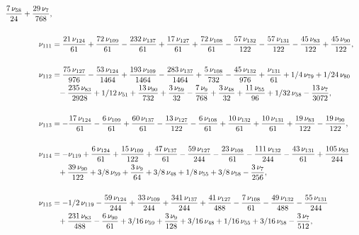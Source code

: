\documentclass[a4paper,12pt, DIV=14, BCOR=5mm, twoside, headsepline]{scrbook}
\begin{document}
\begin{align}
\begin{aligned}
{\frac {7\,\nu_{{58}}}{24}}+{\frac {29\,\nu_{{7}}}{768}}, \\
\\
\nu_{{111}}&={
\frac {21\,\nu_{{124}}}{61}}+{\frac {72\,\nu_{{109}}}{61}}-{\frac {232
\,\nu_{{137}}}{61}}+{\frac {17\,\nu_{{127}}}{61}}+{\frac {72\,\nu_{{
108}}}{61}}-{\frac {57\,\nu_{{132}}}{122}}-{\frac {57\,\nu_{{131}}}{
122}}-{\frac {45\,\nu_{{83}}}{122}}+{\frac {45\,\nu_{{90}}}{122}}, \\
\\
\nu_
{{112}}&={\frac {75\,\nu_{{127}}}{976}}-{\frac {53\,\nu_{{124}}}{1464}}
+{\frac {193\,\nu_{{109}}}{1464}}-{\frac {283\,\nu_{{137}}}{1464}}+{
\frac {5\,\nu_{{108}}}{732}}-{\frac {45\,\nu_{{132}}}{976}}+{\frac {
\nu_{{131}}}{61}}+1/4\,\nu_{{79}}+1/24\,\nu_{{80}}\\
 &\hphantom{=}-{\frac {235\,\nu_{{
83}}}{2928}}+1/12\,\nu_{{51}}+{\frac {13\,\nu_{{90}}}{732}}+{\frac {3
\,\nu_{{59}}}{32}}-{\frac {7\,\nu_{{9}}}{768}}+{\frac {3\,\nu_{{48}}}{
32}}+{\frac {11\,\nu_{{55}}}{96}}+1/32\,\nu_{{58}}-{\frac {13\,\nu_{{7
}}}{3072}}, \\
\\
\nu_{{113}}&=-{\frac {17\,\nu_{{124}}}{61}}-{\frac {6\,\nu_{
{109}}}{61}}+{\frac {60\,\nu_{{137}}}{61}}-{\frac {13\,\nu_{{127}}}{
122}}-{\frac {6\,\nu_{{108}}}{61}}+{\frac {10\,\nu_{{132}}}{61}}+{
\frac {10\,\nu_{{131}}}{61}}+{\frac {19\,\nu_{{83}}}{122}}-{\frac {19
\,\nu_{{90}}}{122}},\\
\\
\nu_{{114}}&=-\nu_{{119}}+{\frac {6\,\nu_{{124}}}{
61}}+{\frac {15\,\nu_{{109}}}{122}}+{\frac {47\,\nu_{{137}}}{61}}-{
\frac {59\,\nu_{{127}}}{244}}-{\frac {23\,\nu_{{108}}}{61}}-{\frac {
111\,\nu_{{132}}}{244}}-{\frac {43\,\nu_{{131}}}{61}}+{\frac {105\,\nu
_{{83}}}{244}}\\
 &\hphantom{=}+{\frac {39\,\nu_{{90}}}{122}}+3/8\,\nu_{{59}}+{\frac {3
\,\nu_{{9}}}{64}}+3/8\,\nu_{{48}}+1/8\,\nu_{{55}}+3/8\,\nu_{{58}}-{
\frac {3\,\nu_{{7}}}{256}}, \\
\\
\nu_{{115}}&=-1/2\,\nu_{{119}}-{\frac {59\,
\nu_{{124}}}{244}}+{\frac {33\,\nu_{{109}}}{244}}+{\frac {341\,\nu_{{
137}}}{244}}+{\frac {41\,\nu_{{127}}}{488}}-{\frac {7\,\nu_{{108}}}{61
}}-{\frac {49\,\nu_{{132}}}{488}}-{\frac {55\,\nu_{{131}}}{244}}\\
 &\hphantom{=}+{
\frac {231\,\nu_{{83}}}{488}}-{\frac {6\,\nu_{{90}}}{61}}+3/16\,\nu_{{
59}}+{\frac {3\,\nu_{{9}}}{128}}+3/16\,\nu_{{48}}+1/16\,\nu_{{55}}+3/
16\,\nu_{{58}}-{\frac {3\,\nu_{{7}}}{512}},
\end{aligned}
\end{align}
\end{document}
